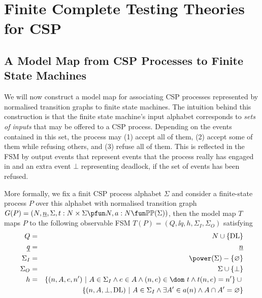 \section{Finite Complete Testing Theories for CSP}
\label{sec:finitecomplete}
\subsection{A Model Map from CSP Processes to Finite State Machines}
\label{sec:mmap}

We will now construct a model map for associating CSP processes represented by normalised transition graphs to finite state machines. The intuition behind this 
construction is that the finite state machine's input alphabet  corresponds to
{\it sets of inputs} that may be offered to a CSP process. Depending on the events 
contained in this set, the process may (1) accept all of them, (2) accept some of them while refusing others, and (3) refuse all of them. This is reflected in the FSM
by output events that represent events that the process really has engaged in and 
an extra event $\bot$ representing deadlock, if the set of events has been refused.

More formally, we fix a finit CSP process alphabet $\Sigma$ and consider a 
finite-state process 
$P$ over this alphabet with normalised transition graph 
$G(P)=( N, \ii n, \Sigma, t : N\times\Sigma \pfun N, a : N \fun \mathbb{P}\mathbb{P}(\Sigma))$,
 then the model map $T$ maps $P$ to the following observable FSM $T(P) = (Q,\ii q, h,\Sigma_I,\Sigma_O)$ satisfying
\begin{eqnarray*}
Q & = & N\cup \{\DL\} 
\\
\ii q & = & \ii n
\\
\Sigma_I & = & \power(\Sigma) - \{ \varnothing \}
\\
\Sigma_O & = & \Sigma \cup \{ \bot\}
\\
h & = & \{ (n,A,e,n')~|~A\in \Sigma_I \wedge e\in A \wedge 
(n,e)\in \dom~t\wedge t(n,e) = n' \} \cup {}
\\ & & 
\{ (n,A,\bot,\DL)~|~A\in \Sigma_I   \wedge 
\exists A'\in a(n) \wedge A\cap A' = \varnothing
  \}
\end{eqnarray*} 

